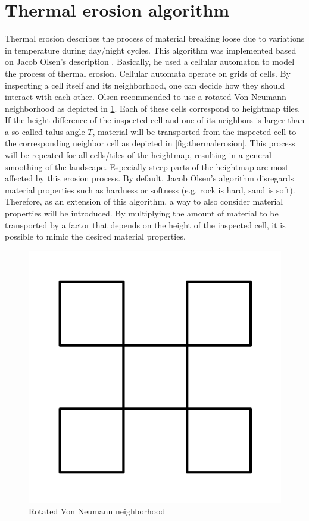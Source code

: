 \documentclass[11pt,a4paper,twoside,openright]{report}
\begin{document}
\section{Thermal erosion algorithm}
\label{sec:thermalerosion}
Thermal erosion describes the process of material breaking loose due to variations in temperature during day/night cycles. This algorithm was implemented based on Jacob Olsen's description \cite{Olsen:2004}. Basically, he used a cellular automaton to model the process of thermal erosion. Cellular automata operate on grids of cells. By inspecting a cell itself and its neighborhood, one can decide how they should interact with each other. Olsen recommended to use a rotated Von Neumann neighborhood as depicted in \cref{fig:rotvonneumann}. Each of these cells correspond to heightmap tiles. If the height difference of the inspected cell and one of its neighbors is larger than a so-called talus angle $T$, material will be transported from the inspected cell to the corresponding neighbor cell as depicted in \cref{fig:thermalerosion}. This process will be repeated for all cells/tiles of the heightmap, resulting in a general smoothing of the landscape. Especially steep parts of the heightmap are most affected by this erosion process. By default, Jacob Olsen's algorithm disregards material properties such as hardness or softness (e.g. rock is hard, sand is soft). Therefore, as an extension of this algorithm, a way to also consider material properties will be introduced. By multiplying the amount of material to be transported by a factor that depends on the height of the inspected cell, it is possible to mimic the desired material properties.
\begin{figure}[h]
\centering
\includegraphics[width=0.25\linewidth]{rotvonneumann.png}
\caption{Rotated Von Neumann neighborhood}\label{fig:rotvonneumann}
\end{figure}
\end{document}
